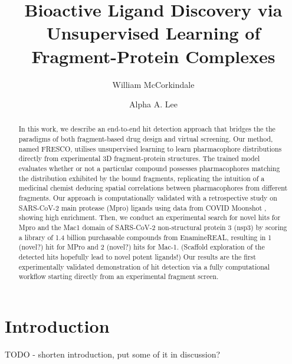 \documentclass[journal=jacsat,manuscript=article]{achemso}
\author{William McCorkindale}
\author{Alpha A. Lee}
\affiliation[Cavendish]{Cavendish Laboratory, University of Cambridge, Cambridge CB3 0HE, United Kingdom}
\title[FRESCO]{Bioactive Ligand Discovery via Unsupervised Learning of Fragment-Protein Complexes}
\begin{document}

\begin{abstract}
In this work, we describe an end-to-end hit detection approach that bridges the the paradigms of both fragment-based drug design and virtual screening. Our method, named FRESCO, utilises unsupervised learning to learn pharmacophore distributions directly from experimental 3D fragment-protein structures. The trained model evaluates whether or not a particular compound possesses pharmacophores matching the distribution exhibited by the bound fragments, replicating the intuition of a medicinal chemist deducing spatial correlations between pharmacophores from different fragments. Our approach is computationally validated with a retrospective study on SARS-CoV-2 main protease (Mpro) ligands using data from COVID Moonshot \cite{Moonshot2022}, showing high enrichment. Then, we conduct an experimental search for novel hits for Mpro and the Mac1 domain of SARS-CoV-2 non-structural protein 3 (nsp3) by scoring a library of 1.4 billion purchasable compounds from EnamineREAL, resulting in 1 (novel?) hit for MPro and 2 (novel?) hits for Mac-1. (Scaffold exploration of the detected hits hopefully lead to novel potent ligands!) Our results are the first experimentally validated demonstration of hit detection via a fully computational workflow starting directly from an experimental fragment screen.
\end{abstract}

\section{Introduction}

TODO - shorten introduction, put some of it in discussion?
\end{document}
